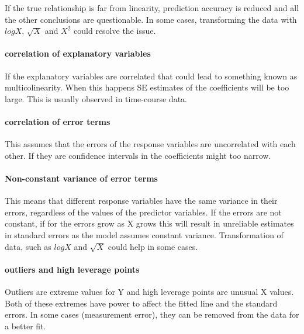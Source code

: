 \documentclass[12pt,]{krantz}
\let\oldparagraph\paragraph
\renewcommand{\paragraph}[1]{\oldparagraph{#1}\mbox{}}
\theoremstyle{definition}
\theoremstyle{definition}
\theoremstyle{definition}
\theoremstyle{remark}
\begin{document}
If the true relationship is far from linearity, prediction accuracy is
reduced and all the other conclusions are questionable. In some cases,
transforming the data with \(logX\), \(\sqrt{X}\) and \(X^2\) could
resolve the issue.

\hypertarget{correlation-of-explanatory-variables}{%
\paragraph{correlation of explanatory
variables}\label{correlation-of-explanatory-variables}}

If the explanatory variables are correlated that could lead to something
known as multicolinearity. When this happens SE estimates of the
coefficients will be too large. This is usually observed in time-course
data.

\hypertarget{correlation-of-error-terms}{%
\paragraph{correlation of error
terms}\label{correlation-of-error-terms}}

This assumes that the errors of the response variables are uncorrelated
with each other. If they are confidence intervals in the coefficients
might too narrow.

\hypertarget{non-constant-variance-of-error-terms}{%
\paragraph{Non-constant variance of error
terms}\label{non-constant-variance-of-error-terms}}

This means that different response variables have the same variance in
their errors, regardless of the values of the predictor variables. If
the errors are not constant, if for the errors grow as X grows this will
result in unreliable estimates in standard errors as the model assumes
constant variance. Transformation of data, such as \(logX\) and
\(\sqrt{X}\) could help in some cases.

\hypertarget{outliers-and-high-leverage-points}{%
\paragraph{outliers and high leverage
points}\label{outliers-and-high-leverage-points}}

Outliers are extreme values for Y and high leverage points are unusual X
values. Both of these extremes have power to affect the fitted line and
the standard errors. In some cases (measurement error), they can be
removed from the data for a better fit.
\end{document}
